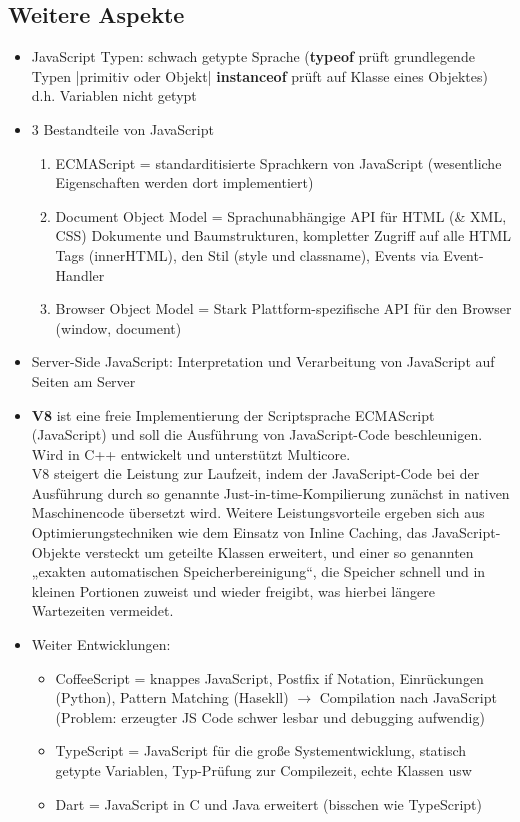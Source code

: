 \documentclass{article} %
\begin{document}
	\subsection{Weitere Aspekte}
	\begin{itemize}
		\item JavaScript Typen: schwach getypte Sprache (\textbf{typeof} prüft grundlegende Typen |primitiv oder Objekt| \textbf{instanceof} prüft auf Klasse eines Objektes) d.h. Variablen nicht getypt
		\item 3 Bestandteile von JavaScript
		\begin{enumerate}
			\item ECMAScript = standarditisierte Sprachkern von JavaScript (wesentliche Eigenschaften werden dort implementiert)
			\item Document Object Model = Sprachunabhängige API für HTML (\& XML, CSS) Dokumente und Baumstrukturen, kompletter Zugriff auf alle HTML Tags (innerHTML), den Stil (style und classname), Events via Event-Handler
			\item Browser Object Model = Stark Plattform-spezifische API für den Browser (window, document)
		\end{enumerate}
		\item Server-Side JavaScript: Interpretation und Verarbeitung von JavaScript auf Seiten am Server
		\item \textbf{V8} ist eine freie Implementierung der Scriptsprache ECMAScript (JavaScript) und soll die Ausführung von JavaScript-Code beschleunigen. Wird in C++ entwickelt und unterstützt Multicore.\\
		V8 steigert die Leistung zur Laufzeit, indem der JavaScript-Code bei der Ausführung durch so genannte Just-in-time-Kompilierung zunächst in nativen Maschinencode übersetzt wird. Weitere Leistungsvorteile ergeben sich aus Optimierungstechniken wie dem Einsatz von Inline Caching, das JavaScript-Objekte versteckt um geteilte Klassen erweitert, und einer so genannten „exakten automatischen Speicherbereinigung“, die Speicher schnell und in kleinen Portionen zuweist und wieder freigibt, was hierbei längere Wartezeiten vermeidet.
		
		\item Weiter Entwicklungen:
		\begin{itemize}
			\item CoffeeScript = knappes JavaScript, Postfix if Notation, Einrückungen (Python), Pattern Matching (Hasekll) $\rightarrow$ Compilation nach JavaScript (Problem: erzeugter JS Code schwer lesbar und debugging aufwendig)
			\item TypeScript = JavaScript für die große Systementwicklung, statisch getypte Variablen, Typ-Prüfung zur Compilezeit, echte Klassen usw
			\item Dart = JavaScript in C und Java erweitert (bisschen wie TypeScript)
		\end{itemize}
	\end{itemize}
	
\end{document}
